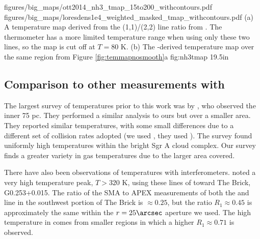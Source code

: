

\RotFigureTwoAA
{figures/big_maps/ott2014_nh3_tmap_15to200_withcontours.pdf}
{figures/big_maps/loresdens1e4_weighted_masked_tmap_withcontours.pdf}
{(a) A temperature map derived from the \ammonia (1,1)/(2,2) line ratio from
\citet{Ott2014a}.  The \ammonia thermometer has a more limited temperature
range when using only these two lines, so the map is cut off at $T=80$ K.
(b) The \para-derived temperature map over the same region from Figure
\ref{fig:temmapnosmooth}a
}
{fig:nh3tmap}
{1}{9.5in}

\subsection{Comparison to other measurements with \para}
\label{sec:h2cocompare}
The largest survey of \para temperatures prior to this work was by
\citet{Ao2013a}, who observed the inner 75 pc.  They performed a similar
analysis to ours but over a smaller area.  They reported similar temperatures,
with some small differences due to a different set of collision rates adopted
(we used \citet{Wiesenfeld2013a}, they used \citet{Green1991a}).  The \citet{Ao2013a}
survey found uniformly high temperatures within the bright Sgr A cloud complex.
Our survey finds a greater variety in gas temperatures due to the larger area
covered.

There have also been observations of \para temperatures with interferometers.
\citet{Johnston2014a} noted a very high temperature peak, $T>320$ K, using these
lines of \para toward The Brick, G0.253+0.015.  The ratio of the
SMA to APEX measurements of both the \threeohthree and \threetwoone line in the
southwest portion of The Brick is $\approx0.25$, but the ratio $R_1\approx0.45$
is approximately the same within the $r=25\arcsec$ aperture we used.  The high
temperature in \citet{Johnston2014a} comes from smaller regions in which a
higher $R_1\approx0.71$ is observed.

